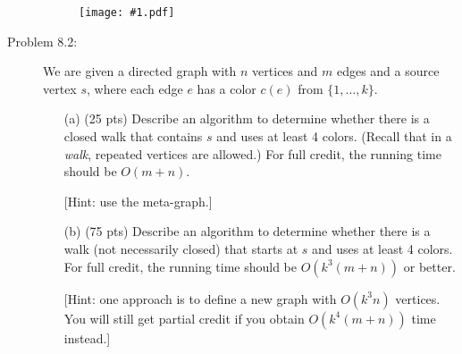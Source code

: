 \documentclass[11pt]{article}
\newcommand{\fig}[2]{\begin{figure}[h]\begin{center}%
  \texttt{[image: \#1.pdf]}\end{center}%
  \end{figure}}
\begin{document}
\begin{description}
\fig{hw8_fig2}{0.7}



\newpage
\item[Problem 8.2:] 
We are given a directed graph with $n$ vertices and $m$ edges and a source vertex $s$,
where each edge $e$ has a color $c(e)$ from $\{1,\ldots,k\}$.
\begin{enumerate}
\item[(a)] (25 pts) Describe an algorithm to determine whether there is a closed walk
that contains $s$ and uses at least 4 colors.  (Recall that in a \emph{walk}, repeated vertices are allowed.)  For full credit, the running time should be $O(m+n)$.

[Hint: use the meta-graph.]

\smallskip
\item[(b)] (75 pts) Describe an algorithm to determine whether there is a walk (not necessarily
closed) that starts at $s$ and uses at least 4 colors.  For full credit, the running time should be $O(k^3(m+n))$ or better.

[Hint: one approach is to define a new graph with $O(k^3n)$ vertices.  You will still
get partial credit if you obtain $O(k^4(m+n))$ time instead.]
\end{enumerate}

\end{description}
\end{document}
